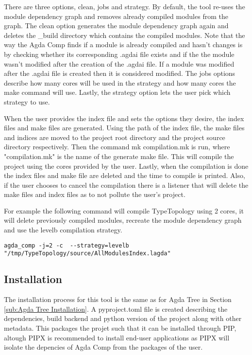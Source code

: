 There are three options, clean, jobs and strategy. By default, the tool re-uses
the module dependency graph and removes already compiled modules from the
graph. The clean option generates the module dependency graph again and deletes
the \_build directory which contains the compiled modules. Note that the way the
Agda Comp finds if a module is already compiled and hasn't changes is by
checking whether its corresponding .agdai file exists and if the the module
wasn't modified after the creation of the .agdai file. If a module was modified
after the .agdai file is created then it is considered modified. The jobs
options describe how many cores will be used in the strategy and how many cores
the make command will use. Lastly, the strategy option lets the user pick which
strategy to use.

When the user provides the index file and sets the options they desire, the
index files and make files are generated. Using the path of the index file, the
make files and indices are moved to the project root directory and the project
source directory respectively. Then the command \textsf{mk compilation.mk} is
run, where "compilation.mk" is the name of the generate make file. This will
compile the project using the cores provided by the user. Lastly, when the
compilation is done the index files and make file are deleted and the time to
compile is printed. Also, if the user chooses to cancel the compilation there
is a listener that will delete the make files and index files as to not pollute
the user's project.

For example the following command will compile TypeTopology using 2 cores, it
will delete previously compiled modules, recreate the module dependency graph
and use the levelb compilation strategy.

\begin{lstlisting}
agda_comp -j=2 -c  --strategy=levelb "/tmp/TypeTopology/source/AllModulesIndex.lagda"
\end{lstlisting}


\subsection{Installation}

The installation process for this tool is the same as for Agda Tree in Section
\ref{sub:Agda Tree Installation}. A pyproject.toml file is created describing
the dependencies, build backend and python version of the project along with
other metadata. This packages the projet such that it can be installed through
PIP, altough PIPX is recommended to install end-user applications as PIPX will
isolate the depencies of Agda Comp from the packages of the user.

